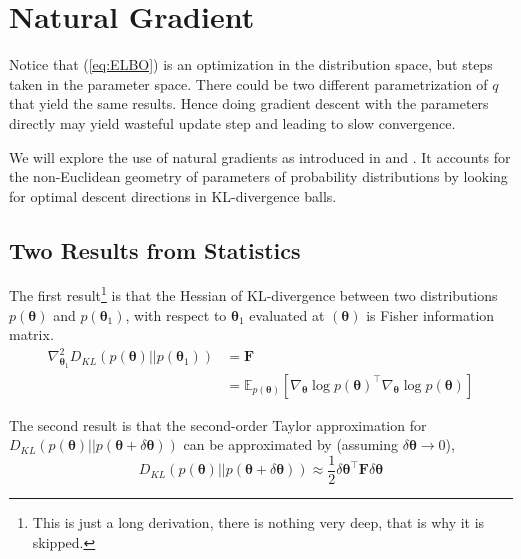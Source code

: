 \documentclass[10pt,twocolumn,letterpaper]{article}
\newcommand{\vect}[1]{\boldsymbol{\mathbf{#1}}}
\begin{document}
\section{Natural Gradient}
Notice that (\ref{eq:ELBO}) is an optimization in the distribution space, but steps taken in the parameter space. There could be two different parametrization of \(q\) that yield the same results. Hence doing gradient descent with the parameters directly may yield wasteful update step and leading to slow convergence.


We will explore the use of natural gradients as introduced in \cite{amari1998natural} and \cite{pascanu2013revisiting}. 
It accounts for the non-Euclidean geometry of parameters of probability distributions by looking for optimal descent directions in KL-divergence balls. 

\subsection{Two Results from Statistics}
The first result\footnote{This is just a long derivation, there is nothing very deep, that is why it is skipped.} is that the Hessian of KL-divergence between two distributions \(p(\vect{\theta})\) and \(p(\vect{\theta}_1)\), with respect to \(\vect{\theta}_1\) evaluated at \((\vect{\theta})\) is Fisher information matrix. 
\begin{align*}
    \nabla_{\vect{\theta}_1}^2 D_{KL}(p(\vect{\theta})|| p(\vect{\theta}_1)) &= \vect{F} \\
    &= \mathbb{E}_{p(\vect{\theta})} [\nabla_{\vect{\theta}} \log p(\vect{\theta})^{\intercal} \nabla_{\vect{\theta}} \log p(\vect{\theta})]
\end{align*}

The second result is that the second-order Taylor approximation for \(D_{KL}(p(\vect{\theta})|| p(\vect{\theta}+\delta \vect{\theta} ))\) can be approximated by (assuming \(\delta \vect{\theta} \to 0\)),
\begin{equation} \label{eq:KL-tsapprox}
D_{KL}(p(\vect{\theta})|| p(\vect{\theta}+\delta \vect{\theta} )) \approx \frac{1}{2}\delta \vect{\theta}^{\intercal}\vect{F}\delta \vect{\theta}
\end{equation}
\end{document}
